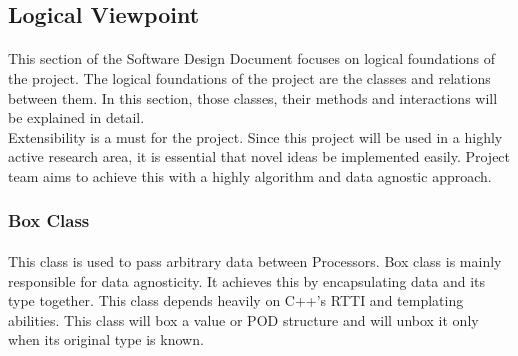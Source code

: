 
\subsection{Logical Viewpoint}
\paragraph{}
\normalsize
This section of the Software Design Document focuses on logical foundations of the project. The logical foundations of the project are the classes and relations between them. In this section, those classes, their methods and interactions will be explained in detail.\\

Extensibility is a must for the project. Since this project will be used in a highly active research area, it is essential that novel ideas be implemented easily. Project team aims to achieve this with a highly algorithm and data agnostic approach.\\
\skipsubsection


\subsubsection{Box Class}
\paragraph{}
\normalsize
This class is used to pass arbitrary data between Processors. Box class is mainly responsible for data agnosticity. It achieves this by encapsulating data and its type together. This class depends heavily on C++'s RTTI and templating abilities. This class will box a value or POD structure and will unbox it only when its original type is known.\\

